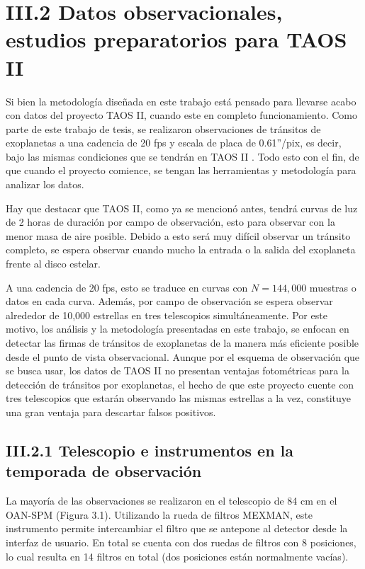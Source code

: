\section*{III.2 Datos observacionales, estudios preparatorios para TAOS II}

Si bien la metodología diseñada en este trabajo está pensado para llevarse acabo con datos del proyecto TAOS II, cuando este en completo funcionamiento. Como parte de este trabajo de tesis, se realizaron observaciones de tránsitos de exoplanetas a una cadencia de 20 fps y escala de placa de 0.61''/pix, es decir, bajo las mismas condiciones que se tendrán en TAOS II \cite{lehner2012transneptunian}. Todo esto con el fin, de que cuando el proyecto comience, se tengan las herramientas y metodología para analizar los datos.

Hay que destacar que TAOS II, como ya se mencionó antes, tendrá curvas de luz de 2 horas de duraci\'on por campo de observación, esto para observar con la menor masa de aire posible. Debido a esto será muy difícil observar un tránsito completo, se espera observar cuando mucho la entrada o la salida del exoplaneta frente al disco estelar. 

A una cadencia de 20 fps, esto se traduce en curvas con $N=144,000$ muestras o datos en cada curva. Además, por campo de observación se espera observar alrededor de 10,000 estrellas en tres telescopios simultáneamente. Por este motivo, los análisis y la metodología presentadas en este trabajo, se enfocan en detectar las firmas de tránsitos de exoplanetas de la manera más eficiente posible desde el punto de vista observacional. Aunque por el esquema de observación que se busca usar, los datos de TAOS II no presentan ventajas fotométricas para la detección de tránsitos por exoplanetas, el hecho de que este proyecto cuente con tres telescopios que estarán observando las mismas estrellas a la vez, constituye una gran ventaja para descartar falsos positivos.

\subsection*{III.2.1 Telescopio e instrumentos en la temporada de observación}

La mayoría de las observaciones se realizaron en el telescopio de 84 cm en el OAN-SPM (Figura 3.1). Utilizando la rueda de filtros MEXMAN, este instrumento permite intercambiar el filtro que se antepone al detector desde la interfaz de usuario. En total se cuenta con dos ruedas de filtros con 8 posiciones, lo cual resulta en 14 filtros en total (dos posiciones están normalmente vacías). 

